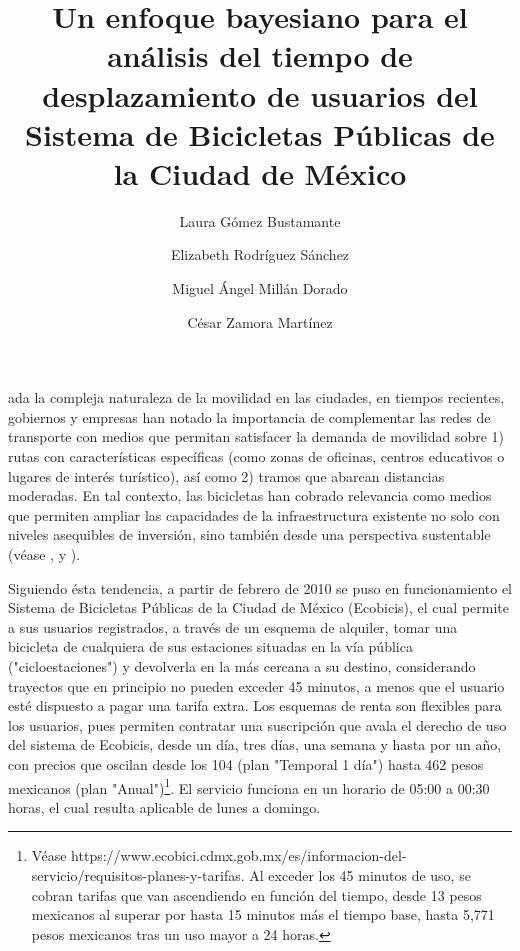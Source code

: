 \documentclass[9pt,twocolumn,twoside]{ilcss}
\title{Un enfoque bayesiano para el análisis del tiempo de desplazamiento de usuarios del Sistema de Bicicletas Públicas de la Ciudad de México}
\author[a]{Laura Gómez Bustamante}
\author[a]{Elizabeth Rodríguez Sánchez}
\author[a]{Miguel Ángel Millán Dorado}
\author[a]{C\'esar Zamora Mart\'inez}
\affil[a]{Alumnos de Maestría en Ciencias de Datos (ITAM)}
\begin{document}
\maketitle
\thispagestyle{firststyle}


ada la compleja naturaleza de la movilidad en las ciudades, en tiempos recientes, gobiernos y empresas han notado la importancia de complementar las redes de transporte con medios que permitan satisfacer la demanda de movilidad sobre 1) rutas con características específicas (como zonas de oficinas, centros educativos o lugares de interés turístico), así como 2) tramos que abarcan distancias moderadas.  En tal contexto, las bicicletas han cobrado relevancia como medios que permiten ampliar las capacidades de la infraestructura existente no solo con niveles asequibles de inversión, sino también desde una perspectiva sustentable (véase \cite{Fishman}, \cite{Pojani} y \cite{Stehlin}).

Siguiendo ésta tendencia, a partir de febrero de 2010 se puso en funcionamiento el Sistema de Bicicletas Públicas de la Ciudad de México (Ecobicis), el cual permite a sus usuarios registrados, a través de un esquema de alquiler, tomar una bicicleta de cualquiera de sus estaciones situadas en la vía pública ("cicloestaciones") y devolverla en la más cercana a su destino,  considerando trayectos que en principio no pueden exceder 45 minutos, a menos que el usuario esté dispuesto a pagar una tarifa extra. Los esquemas de renta son flexibles para los usuarios, pues permiten contratar una suscripción que avala el derecho de uso del sistema de Ecobicis, desde un día, tres días, una semana y hasta por un año, con precios que oscilan desde los 104 (plan "Temporal 1 día") hasta 462 pesos mexicanos (plan "Anual")\footnote{Véase https://www.ecobici.cdmx.gob.mx/es/informacion-del-servicio/requisitos-planes-y-tarifas. Al exceder los 45 minutos de uso, se cobran tarifas que van ascendiendo en función del tiempo, desde 13 pesos mexicanos al superar por hasta 15 minutos más el tiempo base, hasta 5,771 pesos mexicanos tras un uso mayor a 24 horas.}. El servicio funciona en un horario de 05:00 a 00:30 horas, el cual resulta aplicable de lunes a domingo.
\end{document}
